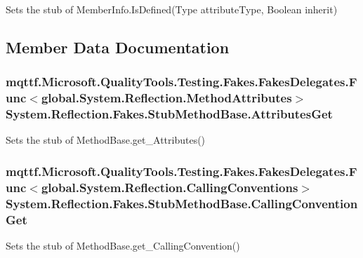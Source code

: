 Sets the stub of Member\-Info.\-Is\-Defined(\-Type attribute\-Type, Boolean inherit)



\subsection{Member Data Documentation}
\hypertarget{class_system_1_1_reflection_1_1_fakes_1_1_stub_method_base_ade19f0d37b476ef91cb7361d779632d1}{
\subsubsection[{Attributes\-Get}]{\setlength{\rightskip}{0pt plus 5cm}mqttf.\-Microsoft.\-Quality\-Tools.\-Testing.\-Fakes.\-Fakes\-Delegates.\-Func$<$global.\-System.\-Reflection.\-Method\-Attributes$>$ System.\-Reflection.\-Fakes.\-Stub\-Method\-Base.\-Attributes\-Get}}\label{class_system_1_1_reflection_1_1_fakes_1_1_stub_method_base_ade19f0d37b476ef91cb7361d779632d1}


Sets the stub of Method\-Base.\-get\-\_\-\-Attributes()

\hypertarget{class_system_1_1_reflection_1_1_fakes_1_1_stub_method_base_ad2a1ad1c7fb5c85738ab08b8af18ef3b}{
\subsubsection[{Calling\-Convention\-Get}]{\setlength{\rightskip}{0pt plus 5cm}mqttf.\-Microsoft.\-Quality\-Tools.\-Testing.\-Fakes.\-Fakes\-Delegates.\-Func$<$global.\-System.\-Reflection.\-Calling\-Conventions$>$ System.\-Reflection.\-Fakes.\-Stub\-Method\-Base.\-Calling\-Convention\-Get}}\label{class_system_1_1_reflection_1_1_fakes_1_1_stub_method_base_ad2a1ad1c7fb5c85738ab08b8af18ef3b}


Sets the stub of Method\-Base.\-get\-\_\-\-Calling\-Convention()

